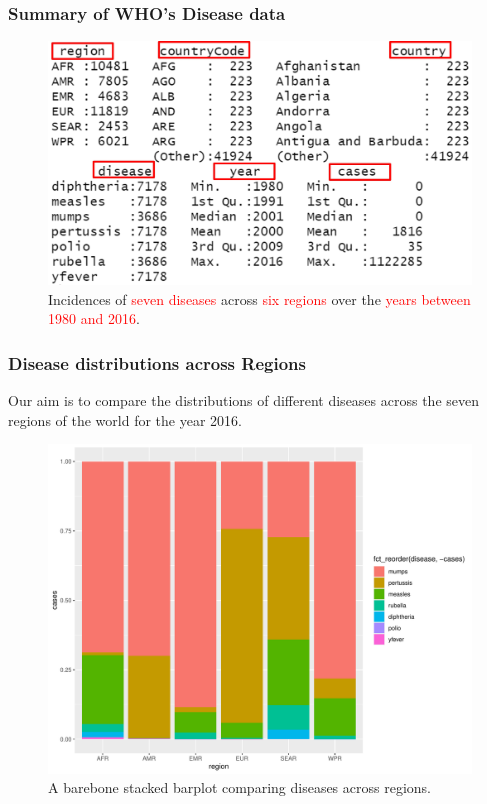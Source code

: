 \documentclass{beamer}
\begin{document}
\begin{frame}\frametitle{Summary of WHO's Disease data}
\begin{figure}
\includegraphics[width=0.99\linewidth]{PlotsLec1/DiseaseSummary}
\caption{Incidences of \textcolor{red}{seven diseases} across  \textcolor{red}{six regions} over the \textcolor{red}{years between 1980 and 2016}.}
\end{figure}
\end{frame}

\begin{frame}\frametitle{Disease distributions across Regions}
Our aim is to compare the distributions of different diseases across the seven regions of the world for the year 2016.
\begin{figure}
\includegraphics[width=0.70\linewidth]{PlotsLec1/BareboneStacked}
\caption{A barebone stacked barplot comparing diseases across regions.}
\end{figure}
\end{frame}
\end{document}

